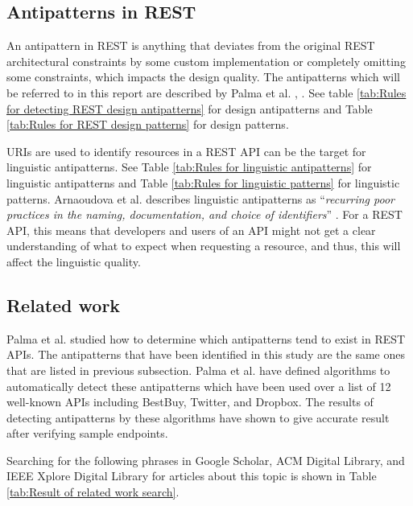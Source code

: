 \documentclass[a4paper,12pt]{article}
\begin{document}
\subsection{Antipatterns in REST}

An antipattern in REST is anything that deviates from the original REST architectural constraints by some custom implementation or completely omitting some constraints, which impacts the design quality. The antipatterns which will be referred to in this report are described by Palma et al. \cite{linguistic}, \cite{design}. See table \ref{tab:Rules for detecting REST design antipatterns} for design antipatterns and Table \ref{tab:Rules for REST design patterns} for design patterns.

URIs are used to identify resources in a REST API can be the target for linguistic antipatterns. See Table \ref{tab:Rules for linguistic antipatterns} for linguistic antipatterns and Table \ref{tab:Rules for linguistic patterns} for linguistic patterns. Arnaoudova et al. describes linguistic antipatterns as “\textit{recurring poor practices in the naming, documentation, and choice of identifiers}” \cite{arnaoudova}. For a REST API, this means that developers and users of an API might not get a clear understanding of what to expect when requesting a resource, and thus, this will affect the linguistic quality. 

\subsection{Related work}

Palma et al. \cite{design} studied how to determine which antipatterns tend to exist in REST APIs. The antipatterns that have been identified in this study are the same ones that are listed in previous subsection. Palma et al. \cite{design} have defined algorithms to automatically detect these antipatterns which have been used over a list of 12 well-known APIs including BestBuy, Twitter, and Dropbox. The results of detecting antipatterns by these algorithms have shown to give accurate result after verifying sample endpoints.

Searching for the following phrases in Google Scholar, ACM Digital Library, and IEEE Xplore Digital Library for articles about this topic is shown in Table \ref{tab:Result of related work search}.
\end{document}
